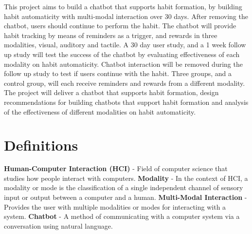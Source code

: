 \newline
This project aims to build a chatbot that supports habit formation, by building habit automaticity with multi-modal interaction over 30 days. After removing the chatbot, users should continue to perform the habit. The chatbot will provide habit tracking by means of reminders as a trigger, and rewards in three modalities, visual, auditory and tactile. A 30 day user study, and a 1 week follow up study will test the success of the chatbot by evaluating effectiveness of each modality on habit automaticity. Chatbot interaction will be removed during the follow up study to test if users continue with the habit. Three groups, and a control group, will each receive reminders and rewards from a different modality.\newline
\newline
The project will deliver a chatbot that supports habit formation, design recommendations for building chatbots that support habit formation and analysis of the effectiveness of different modalities on habit automaticity.

\newpage

\section*{Definitions}

\textbf{Human-Computer Interaction (HCI)} - Field of computer science that studies how people interact with computers.\newline
\newline
\textbf{Modality} - In the context of HCI, a modality or mode is the classification of a single independent channel of sensory input or output between a computer and a human.\newline
\newline
\textbf{Multi-Modal Interaction} - Provides the user with multiple modalities or modes for interacting with a system.\newline
\newline
\textbf{Chatbot} - A method of communicating with a computer system via a conversation using natural language.

\newpage
